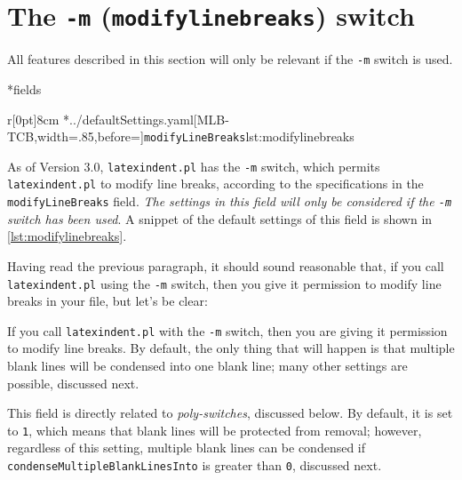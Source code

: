 \section{The \texttt{-m} (\texttt{modifylinebreaks}) switch}
 \label{sec:modifylinebreaks}
 All features described in this section will only be relevant if the \texttt{-m} switch is used.


*{fields}
	\begin{wrapfigure}[7]{r}[0pt]{8cm}
		\cmhlistingsfromfile[style=modifylinebreaks]*{../defaultSettings.yaml}[MLB-TCB,width=.85\linewidth,before=\centering]{\texttt{modifyLineBreaks}}{lst:modifylinebreaks}
	\end{wrapfigure}
	As of Version 3.0, \texttt{latexindent.pl} has the \texttt{-m} switch, which permits \texttt{latexindent.pl} to modify line breaks, according to the specifications in the \texttt{modifyLineBreaks} field.
	\emph{The settings
		in this field will only be considered if the \texttt{-m} switch has been used}.
	A snippet of the default settings of this field is shown in \cref{lst:modifylinebreaks}.

	Having read the previous paragraph, it should sound reasonable that, if you call \texttt{latexindent.pl} using the \texttt{-m} switch, then you give it permission to modify line breaks in your file, but let's be clear: 

	\begin{warning} If you call \texttt{latexindent.pl} with the \texttt{-m} switch, then you are giving it permission to modify line breaks.
		By default, the only thing that will happen is that multiple blank lines will be condensed into one blank line; many other settings are possible, discussed next.
	\end{warning}

	This field is directly related to \emph{poly-switches}, discussed below.
	By default, it is set to \texttt{1}, which means that blank lines will be protected from removal; however, regardless of this setting, multiple blank lines can be condensed if \texttt{condenseMultipleBlankLinesInto} is greater than \texttt{0}, discussed next.

